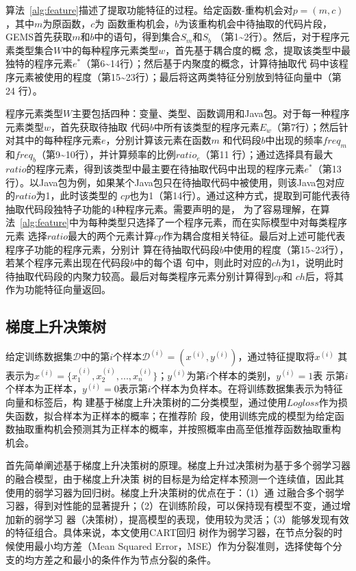 算法~\ref{alg:feature}描述了提取功能特征的过程。给定函数-重构机会对$p=(m,c)$，其中$m$为原函数，$c$为
函数重构机会，$b$为该重构机会中待抽取的代码片段，GEMS首先获取$m$和$b$中的语句，得到集合$S_m$和$S_b$
（第1\textasciitilde2行）。然后，对于程序元素类型集合$W$中的每种程序元素类型$w$，首先基于耦合度的概
念，提取该类型中最独特的程序元素$e^*$（第6\textasciitilde14行）；然后基于内聚度的概念，计算待抽取代
码中该程序元素被使用的程度（第15\textasciitilde23行）；最后将这两类特征分别放到特征向量中（第24
行）。

程序元素类型$W$主要包括四种：变量、类型、函数调用和Java包。对于每一种程序元素类型$w$，首先获取待抽取
代码$b$中所有该类型的程序元素$E_w$（第7行）；然后针对其中的每种程序元素$e$，分别计算该元素在函数$m$
和代码段$b$中出现的频率$freq_m$和$freq_b$（第9\textasciitilde10行），并计算频率的比例$ratio_e$（第11
行）；通过选择具有最大$ratio$的程序元素，得到该类型中最主要在待抽取代码中出现的程序元素$e^*$（第13
行）。以Java包为例，如果某个Java包只在待抽取代码中被使用，则该Java包对应的$ratio$为1，此时该类型的
$cp$也为1（第14行）。通过这种方式，提取到可能代表待抽取代码段独特子功能的4种程序元素。需要声明的是，
为了容易理解，在算法~\ref{alg:feature}中为每种类型只选择了一个程序元素，而在实际模型中对每类程序元素
选择$ratio$最大的两个元素计算$cp$作为耦合度相关特征。最后对上述可能代表程序子功能的程序元素，分别计
算在待抽取代码段$b$中使用的程度（第15\textasciitilde23行），若某个程序元素出现在代码段$b$中的每个语
句中，则此时对应的$ch$为1，说明此时待抽取代码段的内聚力较高。最后对每类程序元素分别计算得到$cp$和
$ch$后，将其作为功能特征向量返回。

\subsection{梯度上升决策树}
给定训练数据集$\mathcal D$中的第$i$个样本${\mathcal D}^{(i)}=(x^{(i)},y^{(i)})$，通过特征提取将$x^{(i)}$
其表示为$x^{(i)}=\{x_1^{(i)},x_2^{(i)},...,x_n^{(i)}\}$；$y^{(i)}$为第$i$个样本的类别，$y^{(i)}=1$表
示第$i$个样本为正样本，$y^{(i)}=0$表示第$i$个样本为负样本。在将训练数据集表示为特征向量和标签后，构
建基于梯度上升决策树的二分类模型，通过使用$Logloss$作为损失函数，拟合样本为正样本的概率；在推荐阶
段，使用训练完成的模型为给定函数抽取重构机会预测其为正样本的概率，并按照概率由高至低推荐函数抽取重构
机会。

首先简单阐述基于梯度上升决策树的原理。梯度上升过决策树为基于多个弱学习器的融合模型，由于梯度上升决策
树的目标是为给定样本预测一个连续值，因此其使用的弱学习器为回归树。梯度上升决策树的优点在于：（1）通
过融合多个弱学习器，得到对性能的显著提升；（2）在训练阶段，可以保持现有模型不变，通过增加新的弱学习
器（决策树），提高模型的表现，使用较为灵活；（3）能够发现有效的特征组合。具体来说，本文使用CART回归
树作为弱学习器，在节点分裂的时候使用最小均方差（Mean Squared Error，MSE）作为分裂准则，选择使每个分
支的均方差之和最小的条件作为节点分裂的条件。

